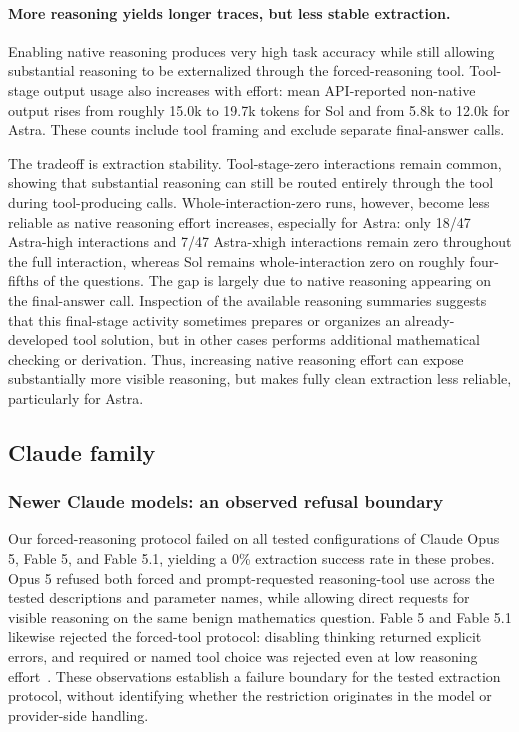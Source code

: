 \paragraph{More reasoning yields longer traces, but less stable extraction.}
Enabling native reasoning produces very high task accuracy while still allowing
substantial reasoning to be externalized through the forced-reasoning tool.
Tool-stage output usage also increases with effort: mean API-reported non-native output rises from roughly 15.0k to 19.7k tokens for Sol and from 5.8k to 12.0k for Astra. These counts include tool framing and exclude separate final-answer calls.

The tradeoff is extraction stability. Tool-stage-zero interactions remain common,
showing that substantial reasoning can still be routed entirely through the tool
during tool-producing calls. Whole-interaction-zero runs, however, become less
reliable as native reasoning effort increases, especially for Astra: only 18/47
Astra-high interactions and 7/47 Astra-xhigh interactions remain zero throughout
the full interaction, whereas Sol remains whole-interaction zero on roughly
four-fifths of the questions. The gap is largely due to native reasoning appearing
on the final-answer call. Inspection of the available reasoning summaries suggests
that this final-stage activity sometimes prepares or organizes an already-developed
tool solution, but in other cases performs additional mathematical checking or
derivation. Thus, increasing native reasoning effort can expose substantially more
visible reasoning, but makes fully clean extraction less reliable, particularly
for Astra.


\subsection{Claude family}
\label{app:claude-family}

\subsubsection{Newer Claude models: an observed refusal boundary}
\label{app:refusal-boundary}

Our forced-reasoning protocol failed on all tested configurations of Claude Opus 5, Fable 5, and Fable 5.1, yielding a 0\% extraction success rate in these probes.
Opus 5 refused both forced and prompt-requested reasoning-tool use across the tested descriptions and parameter names, while allowing direct requests for visible reasoning on the same benign mathematics question.
Fable 5 and Fable 5.1 likewise rejected the forced-tool protocol: disabling thinking returned explicit errors, and required or named tool choice was rejected even at low reasoning effort~\citep{anthropic2026toolconstraints}.
These observations establish a failure boundary for the tested extraction protocol, without identifying whether the restriction originates in the model or provider-side handling.
